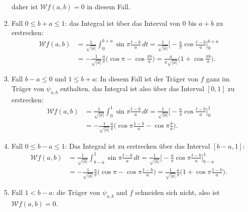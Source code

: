 \begin{loesung}
\begin{teilaufgaben}
\begin{enumerate}
daher ist $\mathcal{W}f(a,b)=0$ in diesem Fall.
\item 
Fall $0\le b+a\le 1$: das Integral ist über das Interval von $0$ bis $a+b$ zu
erstrecken:
\begin{align*}
\mathcal{W}f(a,b)
&=
\frac{1}{\sqrt{|a|}}
\int_0^{b+a} \sin\pi\frac{t-b}{a}\,dt
=
\frac{1}{\sqrt{|a|}}
\biggl[
-\frac{a}{\pi} \cos\frac{t-b}{a}
\biggr]_0^{b+a}
\\
&=
-
\frac{1}{\sqrt{|a|}}
\frac{a}{\pi}
\biggl(
\cos \pi
-
\cos\frac{\pi b}{a}
\biggr)
=
\frac{a}{\pi\sqrt{|a|}}
\biggl(1+\cos\frac{\pi b}{a}\biggr).
\end{align*}
\item
Fall $b-a \le 0$ und $1 \le b+a$: In diesem Fall ist der Träger von $f$
ganz im Träger von $\psi_{a,b}$ enthalten, das Integral ist also über das
Interval $[0,1]$ zu erstrecken:
\begin{align*}
\mathcal{W}f(a,b)
&=
\frac{1}{\sqrt{|a|}}
\int_0^1 
\sin \pi\frac{t-b}{a}
\,dt
=
\frac{1}{\sqrt{|a|}}
\biggl[
-\frac{a}{\pi} \cos\frac{t-b}{a}
\biggr]_0^1
\\
&=
-\frac{1}{\sqrt{|a|}}
\frac{a}{\pi}
\biggl(
\cos\pi\frac{1-b}{a}
-
\cos\pi \frac{b}{a}
\biggr).
\end{align*}
\item
Fall $0\le b-a\le 1$: Das Integral ist zu erstrecken über das Interval
$[b-a,1]$:
\begin{align*}
\mathcal{W}f(a,b)
&=
\frac{1}{\sqrt{|a|}}
\int_{b-a}^1
\sin\pi\frac{t-b}{a}\,dt
=
\frac{1}{\sqrt{|a|}}
\biggl[
-
\frac{a}{\pi} \cos\pi\frac{t-b}{a}
\biggr]_{b-a}^1
\\
&=
-
\frac{1}{\sqrt{|a|}}
\frac{a}{\pi}
\biggl(
\cos\pi
-
\cos\pi\frac{1-b}{a}
\biggr)
=
\frac{1}{\sqrt{|a|}}
\frac{a}{\pi}\biggl(
1+\cos\pi\frac{1-b}a
\biggr).
\end{align*}
\item
Fall $1<b-a$: die Träger von $\psi_{a,b}$ and $f$ schneiden sich nicht,
also ist $\mathcal{W}f(a,b)=0$.
\end{enumerate}
%
%
\begin{figure}
\centering

\end{figure}
\end{teilaufgaben}
\end{loesung}
